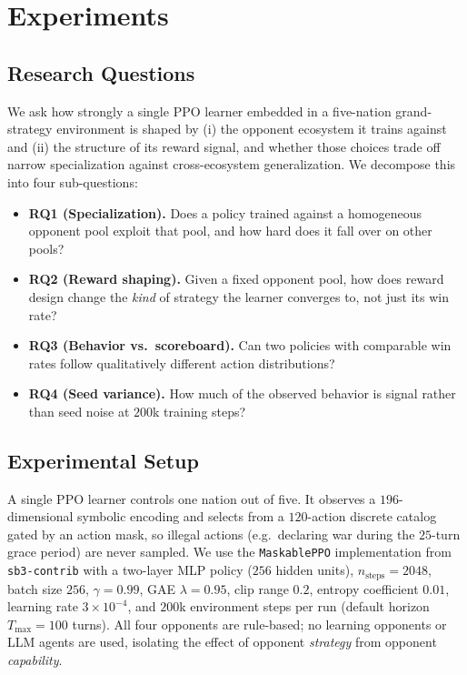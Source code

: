 \section{Experiments}
\label{sec:experiments}

\subsection{Research Questions}
\label{sec:rqs}

We ask how strongly a single PPO learner embedded in a five-nation
grand-strategy environment is shaped by (i) the opponent ecosystem it trains
against and (ii) the structure of its reward signal, and whether those choices
trade off narrow specialization against cross-ecosystem generalization. We
decompose this into four sub-questions:

\begin{itemize}
    \item \textbf{RQ1 (Specialization).} Does a policy trained against a
          homogeneous opponent pool exploit that pool, and how hard does it
          fall over on other pools?
    \item \textbf{RQ2 (Reward shaping).} Given a fixed opponent pool, how does
          reward design change the \emph{kind} of strategy the learner
          converges to, not just its win rate?
    \item \textbf{RQ3 (Behavior vs.\ scoreboard).} Can two policies with
          comparable win rates follow qualitatively different action
          distributions?
    \item \textbf{RQ4 (Seed variance).} How much of the observed behavior is
          signal rather than seed noise at $200$k training steps?
\end{itemize}

\subsection{Experimental Setup}
\label{sec:setup}

A single PPO learner controls one nation out of five. It observes a
$196$-dimensional symbolic encoding and selects from a $120$-action discrete
catalog gated by an action mask, so illegal actions (e.g.\ declaring war
during the $25$-turn grace period) are never sampled. We use the
\texttt{MaskablePPO} implementation from \texttt{sb3-contrib} with a two-layer
MLP policy ($256$ hidden units), $n_{\text{steps}}{=}2048$, batch size $256$,
$\gamma{=}0.99$, GAE $\lambda{=}0.95$, clip range $0.2$, entropy coefficient
$0.01$, learning rate $3{\times}10^{-4}$, and $200$k environment steps per
run (default horizon $T_{\max}{=}100$ turns). All four opponents are
rule-based; no learning opponents or LLM agents are used, isolating the effect
of opponent \emph{strategy} from opponent \emph{capability}.

